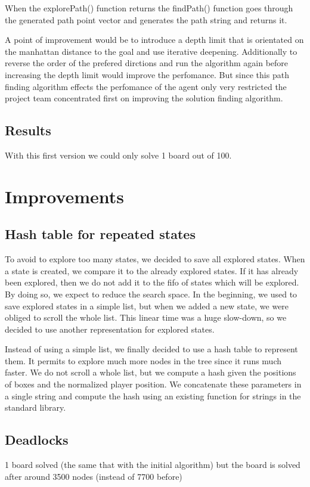 \documentclass[a4paper,10pt]{article}
\begin{document}
	When the explorePath() function returns the findPath() function goes through the generated path point vector and generates 		the path string and returns it.

	A point of improvement would be to introduce a depth limit that is orientated on the manhattan distance to the goal and use 		iterative deepening. Additionally to reverse the order of the prefered dirctions and run the algorithm again before 		increasing the depth limit would improve the perfomance. But since this path finding algorithm effects the perfomance of the 		agent only very restricted the project team concentrated first on improving the solution finding algorithm.

	\subsection{Results}
	With this first version we could only solve 1 board out of 100. 

\section{Improvements}
    \subsection{Hash table for repeated states}
    To avoid to explore too many states, we decided to save all explored states. 
    When a state is created, we compare it to the already explored states. 
    If it has already been explored, then we do not add it to the fifo of states which will be explored. 
    By doing so, we expect to reduce the search space. 
    In the beginning, we used to save explored states in a simple list, but when we added a new state, we were obliged to scroll the whole list. 
    This linear time was a huge slow-down, so we decided to use another representation for explored states.
    
    Instead of using a simple list, we finally decided to use a hash table to represent them. 
    It permits to explore much more nodes in the tree since it runs much faster. 
    We do not scroll a whole list, but we compute a hash given the positions of boxes and the normalized player position. 
    We concatenate these parameters in a single string and compute the hash using an existing function for strings in the standard library.

	\subsection{Deadlocks}
	1 board solved (the same that with the initial algorithm) but the board is solved after around 3500 nodes (instead of 7700 before)
\end{document}
